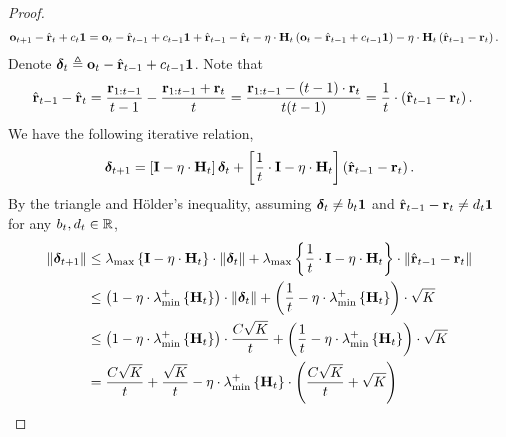 \begin{proof}
\begin{equation*}
\begin{split}
    {\mathbf{o}}_{t+1} - \hat{{\mathbf{r}}}_t + c_{t} {\mathbf{1}} &= {\mathbf{o}}_{t} - \hat{{\mathbf{r}}}_{t-1} + c_{t-1} {\mathbf{1}} + \hat{{\mathbf{r}}}_{t-1} - \hat{{\mathbf{r}}}_t - \eta \cdot {\mathbf{H}}_t \left( {\mathbf{o}}_{t} - \hat{{\mathbf{r}}}_{t-1} + c_{t-1} {\mathbf{1}} \right) - \eta \cdot {\mathbf{H}}_t \left( \hat{{\mathbf{r}}}_{t-1} - {\mathbf{r}}_t \right).
\end{split}
\end{equation*}
Denote ${\boldsymbol{\delta}}_{t} \triangleq {\mathbf{o}}_{t} - \hat{{\mathbf{r}}}_{t-1} + c_{t-1} {\mathbf{1}}$. Note that
\begin{equation*}
\begin{split}
    \hat{{\mathbf{r}}}_{t-1} - \hat{{\mathbf{r}}}_t &= \frac{{\mathbf{r}}_{1:t-1}}{t-1} - \frac{{\mathbf{r}}_{1:t-1} + {\mathbf{r}}_t}{t} = \frac{{\mathbf{r}}_{1:t-1} - (t-1) \cdot {\mathbf{r}}_t }{t(t-1)} = \frac{1}{t} \cdot \left( \hat{{\mathbf{r}}}_{t-1} - {\mathbf{r}}_t \right).
\end{split}
\end{equation*}
We have the following iterative relation,
\begin{equation*}
\begin{split}
    {\boldsymbol{\delta}}_{t+1} = \left[ {\mathbf{I}} - \eta \cdot {\mathbf{H}}_t \right] {\boldsymbol{\delta}}_t + \left[ \frac{1}{t} \cdot {\mathbf{I}} - \eta \cdot {\mathbf{H}}_t \right] \left( \hat{{\mathbf{r}}}_{t-1} - {\mathbf{r}}_t \right).
\end{split}
\end{equation*}
By the triangle and H{\" o}lder's inequality, assuming ${\boldsymbol{\delta}}_t \not= b_t {\mathbf{1}}$ and $\hat{{\mathbf{r}}}_{t-1} - {\mathbf{r}}_t \not= d_t {\mathbf{1}}$ for any $b_t, d_t \in {\mathbb{R}}$,
\begin{equation*}
\begin{split}
    \left\| \rvdelta_{t+1} \right\| &\le \lambda_{\max}\left\{ \rmI - \eta \cdot \rmH_t \right\} \cdot \left\| \rvdelta_{t} \right\| + \lambda_{\max}\left\{ \frac{1}{t} \cdot \rmI - \eta \cdot \rmH_t \right\} \cdot \left\| \hat{\rvr}_{t-1} - \rvr_t \right\| \\
    &\le \left( 1 - \eta \cdot \lambda_{\min}^{+}\left\{ \rmH_t \right\} \right) \cdot \left\| \rvdelta_{t} \right\| + \left( \frac{1}{t} - \eta \cdot \lambda_{\min}^{+}\left\{ \rmH_t \right\} \right) \cdot \sqrt{K} \\
    &\le \left( 1 - \eta \cdot \lambda_{\min}^{+}\left\{ \rmH_t \right\} \right) \cdot \frac{C \sqrt{K}}{t} + \left( \frac{1}{t} - \eta \cdot \lambda_{\min}^{+}\left\{ \rmH_t \right\} \right) \cdot \sqrt{K} \\
    &= \frac{C \sqrt{K}}{t} + \frac{\sqrt{K}}{t} - \eta \cdot \lambda_{\min}^{+}\left\{ \rmH_t \right\} \cdot \left( \frac{C \sqrt{K}}{t} + \sqrt{K} \right) \\

\end{split}
\end{equation*}
\end{proof}
